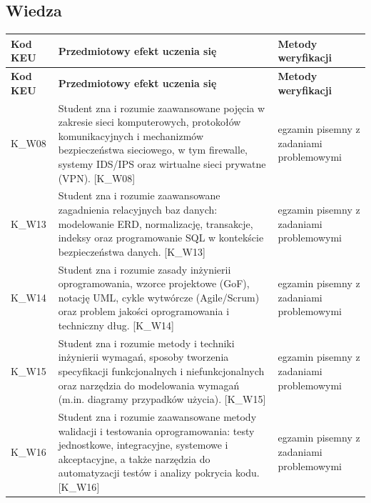 \documentclass[12pt, a4paper]{article}
\newcommand{\thdrule}{\noalign{\global\setlength{\extrarowheight}{0pt}}}
\newcommand{\thdend}{\noalign{\global\setlength{\extrarowheight}{3pt}}}
\begin{document}
\subsection*{Wiedza}
{\scriptsize
\begin{longtable}{m{1.6cm}m{9.0cm}m{4.2cm}}
\thdrule\toprule
\rowcolor{pjatkRed} {\color{white}\footnotesize\textbf{\vphantom{Ag}Kod KEU}} & {\color{white}\footnotesize\textbf{\vphantom{Ag}Przedmiotowy efekt uczenia się}} & {\color{white}\footnotesize\textbf{\vphantom{Ag}Metody weryfikacji}} \\
\midrule\thdend
\endfirsthead
\thdrule\toprule
\rowcolor{pjatkRed} {\color{white}\footnotesize\textbf{\vphantom{Ag}Kod KEU}} & {\color{white}\footnotesize\textbf{\vphantom{Ag}Przedmiotowy efekt uczenia się}} & {\color{white}\footnotesize\textbf{\vphantom{Ag}Metody weryfikacji}} \\
\midrule\thdend
\endhead
  \rowcolor{tableRowLight} K\_W08 & Student zna i rozumie zaawansowane pojęcia w zakresie sieci komputerowych, protokołów komunikacyjnych i mechanizmów bezpieczeństwa sieciowego, w tym firewalle, systemy IDS/IPS oraz wirtualne sieci prywatne (VPN). {[}K\_W08{]} & egzamin pisemny z zadaniami problemowymi \\
  \rowcolor{tableRowAlt} K\_W13 & Student zna i rozumie zaawansowane zagadnienia relacyjnych baz danych: modelowanie ERD, normalizację, transakcje, indeksy oraz programowanie SQL w kontekście bezpieczeństwa danych. {[}K\_W13{]} & egzamin pisemny z zadaniami problemowymi \\
  \rowcolor{tableRowLight} K\_W14 & Student zna i rozumie zasady inżynierii oprogramowania, wzorce projektowe (GoF), notację UML, cykle wytwórcze (Agile/Scrum) oraz problem jakości oprogramowania i techniczny dług. {[}K\_W14{]} & egzamin pisemny z zadaniami problemowymi \\
  \rowcolor{tableRowAlt} K\_W15 & Student zna i rozumie metody i techniki inżynierii wymagań, sposoby tworzenia specyfikacji funkcjonalnych i niefunkcjonalnych oraz narzędzia do modelowania wymagań (m.in. diagramy przypadków użycia). {[}K\_W15{]} & egzamin pisemny z zadaniami problemowymi \\
  \rowcolor{tableRowLight} K\_W16 & Student zna i rozumie zaawansowane metody walidacji i testowania oprogramowania: testy jednostkowe, integracyjne, systemowe i akceptacyjne, a także narzędzia do automatyzacji testów i analizy pokrycia kodu. {[}K\_W16{]} & egzamin pisemny z zadaniami problemowymi \\
\bottomrule
\end{longtable}}
\end{document}
